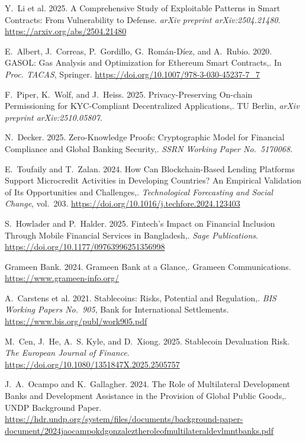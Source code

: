 {\begin{enumerate}[label={[\arabic*]}]
\item Y.~Li et al. 2025. A Comprehensive Study of Exploitable Patterns in Smart Contracts: From Vulnerability to Defense. \emph{arXiv preprint arXiv:2504.21480}. \url{https://arxiv.org/abs/2504.21480}

\item E.~Albert, J.~Correas, P.~Gordillo, G.~Rom\'{a}n-D\'{i}ez, and A.~Rubio. 2020. GASOL: Gas Analysis and Optimization for Ethereum Smart Contracts,. In \emph{Proc. TACAS}, Springer. \url{https://doi.org/10.1007/978-3-030-45237-7_7}

\item F.~Piper, K.~Wolf, and J.~Heiss. 2025. Privacy-Preserving On-chain Permissioning for KYC-Compliant Decentralized Applications,. TU Berlin, \emph{arXiv preprint arXiv:2510.05807}.

\item N.~Decker. 2025. Zero-Knowledge Proofs: Cryptographic Model for Financial Compliance and Global Banking Security,. \emph{SSRN Working Paper No.~5170068}.

\item E.~Toufaily and T.~Zalan. 2024. How Can Blockchain-Based Lending Platforms Support Microcredit Activities in Developing Countries? An Empirical Validation of Its Opportunities and Challenges,. \emph{Technological Forecasting and Social Change}, vol.~203. \url{https://doi.org/10.1016/j.techfore.2024.123403}

\item S.~Howlader and P.~Halder. 2025. Fintech's Impact on Financial Inclusion Through Mobile Financial Services in Bangladesh,. \emph{Sage Publications}. \url{https://doi.org/10.1177/09763996251356998}

\item Grameen Bank. 2024. Grameen Bank at a Glance,. Grameen Communications. \url{https://www.grameen-info.org/}

\item A.~Carstens et al. 2021. Stablecoins: Risks, Potential and Regulation,. \emph{BIS Working Papers No.~905}, Bank for International Settlements. \url{https://www.bis.org/publ/work905.pdf}

\item M.~Cen, J.~He, A.~S. Kyle, and D.~Xiong. 2025. Stablecoin Devaluation Risk. \emph{The European Journal of Finance}. \url{https://doi.org/10.1080/1351847X.2025.2505757}

\item J.~A.~Ocampo and K.~Gallagher. 2024. The Role of Multilateral Development Banks and Development Assistance in the Provision of Global Public Goods,. UNDP Background Paper. \url{https://hdr.undp.org/system/files/documents/background-paper-document/2024jaocampokdgonzaleztheroleofmultilateraldevlmntbanks.pdf}


\end{enumerate}}

